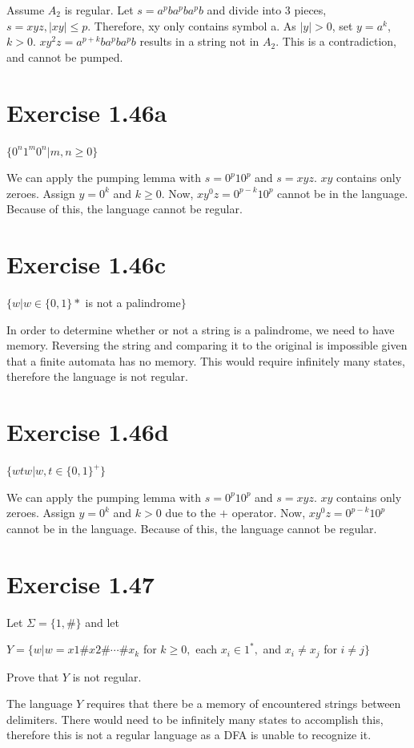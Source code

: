 \documentclass[a4paper,12pt]{article}
\begin{document}
Assume $A_2$ is regular.
Let $s=a^pba^pba^pb$ and divide into 3 pieces, $s=xyz, |xy| \leq p$.
Therefore, xy only contains symbol a.
As $|y|>0$, set $y=a^k$, $k>0$.
$xy^2z = a^{p+k}ba^pba^pb$ results in a string not in $A_2$.
This is a contradiction, and cannot be pumped.

\section{Exercise 1.46a}
$\{0^n 1^m 0^n | m, n \geq 0\}$

We can apply the pumping lemma with $s=0^p10^p$ and $s=xyz$.
$xy$ contains only zeroes.
Assign $y=0^k$ and $k \geq 0$.
Now, $xy^0z = 0^{p-k}10^p$ cannot be in the language.
Because of this, the language cannot be regular.

\section{Exercise 1.46c}
$\{w| w \in \{0,1\} *$ is not a palindrome$\}$

In order to determine whether or not a string is a palindrome, we need to have memory.
Reversing the string and comparing it to the original is impossible given that a finite
automata has no memory.
This would require infinitely many states, therefore the language is not regular.

\section{Exercise 1.46d}
$\{wtw| w, t \in \{0,1\}^+ \}$

We can apply the pumping lemma with $s=0^p10^p$ and $s=xyz$.
$xy$ contains only zeroes.
Assign $y=0^k$ and $k > 0$ due to the $+$ operator.
Now, $xy^0z = 0^{p-k}10^p$ cannot be in the language.
Because of this, the language cannot be regular.

\section{Exercise 1.47}
Let $\Sigma = \{1, \#\}$ and let

$Y = \{w| w = x 1 \#x 2 \# \cdots \#x_k$ for $k \geq 0,$ each $x_i \in 1^* ,$ and $x_i \neq x_j$ for $i \neq j\}$

Prove that $Y$ is not regular.

The language $Y$ requires that there be a memory of encountered strings between delimiters.
There would need to be infinitely many states to accomplish this, therefore this is
not a regular language as a DFA is unable to recognize it.
\end{document}
